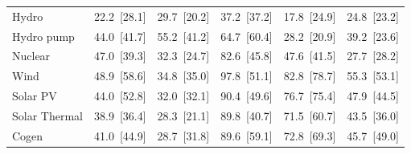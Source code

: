 \begin{tabular}{l r r r r r}
Hydro & 22.2~{\color{seasoncol}\scriptsize[28.1]} & 29.7~{\color{seasoncol}\scriptsize[20.2]} & 37.2~{\color{seasoncol}\scriptsize[37.2]} & 17.8~{\color{seasoncol}\scriptsize[24.9]} & 24.8~{\color{seasoncol}\scriptsize[23.2]} \\
Hydro pump & 44.0~{\color{seasoncol}\scriptsize[41.7]} & 55.2~{\color{seasoncol}\scriptsize[41.2]} & 64.7~{\color{seasoncol}\scriptsize[60.4]} & 28.2~{\color{seasoncol}\scriptsize[20.9]} & 39.2~{\color{seasoncol}\scriptsize[23.6]} \\
Nuclear & 47.0~{\color{seasoncol}\scriptsize[39.3]} & 32.3~{\color{seasoncol}\scriptsize[24.7]} & 82.6~{\color{seasoncol}\scriptsize[45.8]} & 47.6~{\color{seasoncol}\scriptsize[41.5]} & 27.7~{\color{seasoncol}\scriptsize[28.2]} \\
Wind & 48.9~{\color{seasoncol}\scriptsize[58.6]} & 34.8~{\color{seasoncol}\scriptsize[35.0]} & 97.8~{\color{seasoncol}\scriptsize[51.1]} & 82.8~{\color{seasoncol}\scriptsize[78.7]} & 55.3~{\color{seasoncol}\scriptsize[53.1]} \\
Solar PV & 44.0~{\color{seasoncol}\scriptsize[52.8]} & 32.0~{\color{seasoncol}\scriptsize[32.1]} & 90.4~{\color{seasoncol}\scriptsize[49.6]} & 76.7~{\color{seasoncol}\scriptsize[75.4]} & 47.9~{\color{seasoncol}\scriptsize[44.5]} \\
Solar Thermal & 38.9~{\color{seasoncol}\scriptsize[36.4]} & 28.3~{\color{seasoncol}\scriptsize[21.1]} & 89.8~{\color{seasoncol}\scriptsize[40.7]} & 71.5~{\color{seasoncol}\scriptsize[60.7]} & 43.5~{\color{seasoncol}\scriptsize[36.0]} \\
Cogen & 41.0~{\color{seasoncol}\scriptsize[44.9]} & 28.7~{\color{seasoncol}\scriptsize[31.8]} & 89.6~{\color{seasoncol}\scriptsize[59.1]} & 72.8~{\color{seasoncol}\scriptsize[69.3]} & 45.7~{\color{seasoncol}\scriptsize[49.0]} \\
\bottomrule
\end{tabular}
